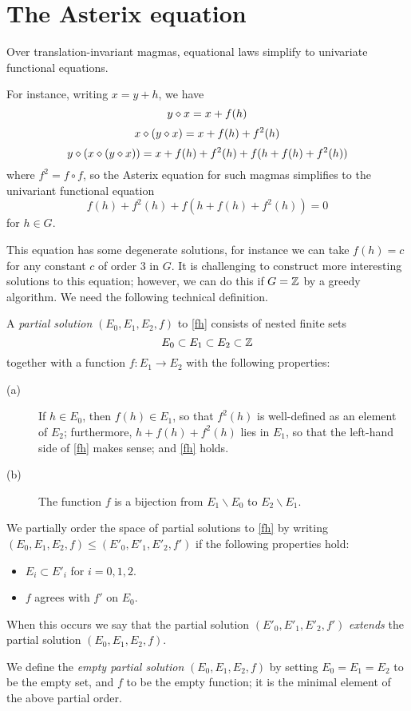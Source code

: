 \section{The Asterix equation}\label{asterix-section}

Over translation-invariant magmas, equational laws simplify to univariate functional equations.

For instance, writing $x = y+h$, we have
$$ y \diamond x = x + f(h)$$
$$ x \diamond (y \diamond x) = x + f(h) + f^2(h)$$
$$ y \diamond (x \diamond (y \diamond x)) = x + f(h) + f^2(h) + f( h + f(h) + f^2(h) )$$
where $f^2 = f \circ f$, so the Asterix equation for such magmas simplifies to the univariant functional equation
\begin{equation}\label{fh}
   f(h) + f^2(h) + f( h + f(h) + f^2(h) ) = 0
\end{equation}
for $h \in G$.

This equation has some degenerate solutions, for instance we can take $f(h) = c$ for any constant $c$ of order $3$ in $G$.  It is challenging to construct more interesting solutions to this equation; however, we can do this if $G=\mathbb{Z}$ by a greedy algorithm.  We need the following technical definition.

\begin{definition}\label{partial-solution}  A \emph{partial solution} $(E_0, E_1, E_2, f)$ to \eqref{fh} consists of nested finite sets
$$ E_0 \subset E_1 \subset E_2 \subset \mathbb{Z}$$ together with a function $f: E_1 \to E_2$ with the following properties:
\begin{description}
  \item[(a)] If $h \in E_0$, then $f(h) \in E_1$, so that $f^2(h)$ is well-defined as an element of $E_2$; furthermore, $h + f(h) + f^2(h)$ lies in $E_1$, so that the left-hand side of \eqref{fh} makes sense; and \eqref{fh} holds.
  \item[(b)] The function $f$ is a bijection from $E_1 \backslash E_0$ to $E_2 \backslash E_1$.
\end{description}

We partially order the space of partial solutions to \eqref{fh} by writing $(E_0, E_1, E_2, f) \leq (E'_0, E'_1, E'_2, f')$ if the following properties hold:
\begin{itemize}
  \item $E_i \subset E'_i$ for $i=0,1,2$.
  \item $f$ agrees with $f'$ on $E_0$.
\end{itemize}
When this occurs we say that the partial solution $(E'_0, E'_1, E'_2, f')$ \emph{extends} the partial solution $(E_0, E_1, E_2, f)$.

We define the \emph{empty partial solution} $(E_0,E_1,E_2,f)$ by setting $E_0=E_1=E_2$ to be the empty set, and $f$ to be the empty function; it is the minimal element of the above partial order.
\end{definition}



